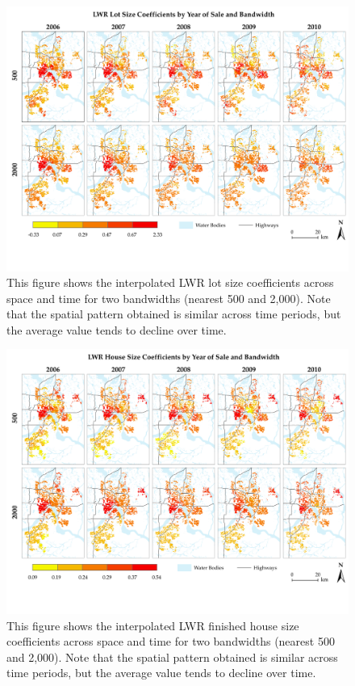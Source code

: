 \documentclass{article}\usepackage{graphicx, color}
\begin{document}
\begin{figure}
 \includegraphics[trim = 0cm 2cm 0cm 0cm, clip = true, width = \textwidth]{../graphs/Acre_50_200_ByYear}
 \caption{This figure shows the interpolated LWR lot size coefficients across space and time for two bandwidths (nearest 500 and 2,000). Note that the spatial pattern obtained is similar across time periods, but the average value tends to decline over time.}
 \label{fig:AcreTime}
\end{figure}

\begin{figure}
 \includegraphics[trim = 0cm 2cm 0cm 0cm, clip = true, width = \textwidth]{../graphs/FinFt_50_200_ByYear}
 \caption{This figure shows the interpolated LWR finished house size coefficients across space and time for two bandwidths (nearest 500 and 2,000). Note that the spatial pattern obtained is similar across time periods, but the average value tends to decline over time.}
 \label{fig:HouseTime}
\end{figure}
\end{document}
